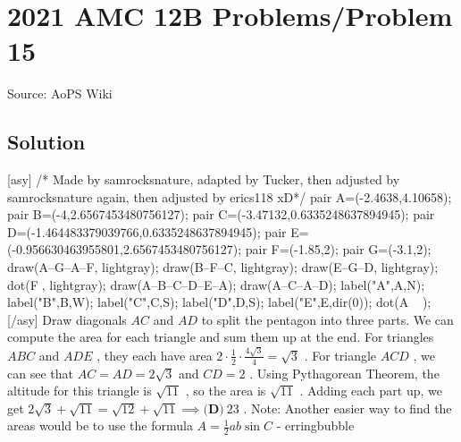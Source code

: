\documentclass[12pt]{article}
\begin{document}
\section*{{2021 AMC 12B Problems/Problem 15}}
Source: AoPS Wiki

\subsection*{Solution}
[asy] /* Made by samrocksnature, adapted by Tucker, then adjusted by samrocksnature again, then adjusted by erics118 xD*/ pair A=(-2.4638,4.10658); pair B=(-4,2.6567453480756127); pair C=(-3.47132,0.6335248637894945); pair D=(-1.464483379039766,0.6335248637894945); pair E=(-0.956630463955801,2.6567453480756127); pair F=(-1.85,2); pair G=(-3.1,2); draw(A--G--A--F, lightgray); draw(B--F--C, lightgray); draw(E--G--D, lightgray); dot(F^^G, lightgray); draw(A--B--C--D--E--A); draw(A--C--A--D); label("A",A,N); label("B",B,W); label("C",C,S); label("D",D,S); label("E",E,dir(0)); dot(A^^B^^C^^D^^E); [/asy] Draw diagonals $AC$ and $AD$ to split the pentagon into three parts. We can compute the area for each triangle and sum them up at the end. For triangles $ABC$ and $ADE$ , they each have area $2\cdot\frac{1}{2}\cdot\frac{4\sqrt{3}}{4}=\sqrt{3}$ . For triangle $ACD$ , we can see that $AC=AD=2\sqrt{3}$ and $CD=2$ . Using Pythagorean Theorem, the altitude for this triangle is $\sqrt{11}$ , so the area is $\sqrt{11}$ . Adding each part up, we get $2\sqrt{3}+\sqrt{11}=\sqrt{12}+\sqrt{11} \implies \boxed{\textbf{(D)} ~23}$ . Note: Another easier way to find the areas would be to use the formula $A=\frac12ab\sin C$ - erringbubble
\end{document}
